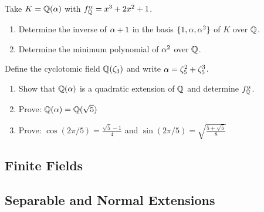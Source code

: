     \begin{ex}{21.29}
        Take $K=\mathbb{Q}(\alpha)$ with $f^\alpha_{\mathbb{Q}}=x^3+2x^2+1$.
        \begin{enumerate}
            \item Determine the inverse of $\alpha+1$ in the basis $\{1,\alpha,\alpha^2\}$ of $K$ over $\mathbb{Q}$.
            \item Determine the minimum polynomial of $\alpha^2$ over $\mathbb{Q}$.
        \end{enumerate}
    \end{ex}

    \begin{ex}{21.30}
        Define the cyclotomic field $\mathbb{Q}(\zeta_3)$ and write $\alpha=\zeta_5^2+\zeta_5^3$.
        \begin{enumerate}
            \item Show that $\mathbb{Q}(\alpha)$ is a quadratic extension of $\mathbb{Q}$ and determine $f^\alpha_{\mathbb{Q}}$.
            \item Prove: $\mathbb{Q}(\alpha)=\mathbb{Q}(\sqrt{5})$
            \item Prove: $\cos(2\pi/5)=\frac{\sqrt{5}-1}{4}$ and $\sin(2\pi/5)=\sqrt{\frac{5+\sqrt{5}}{8}}$
        \end{enumerate}
    \end{ex}
\subsection{Finite Fields}

\subsection{Separable and Normal Extensions}